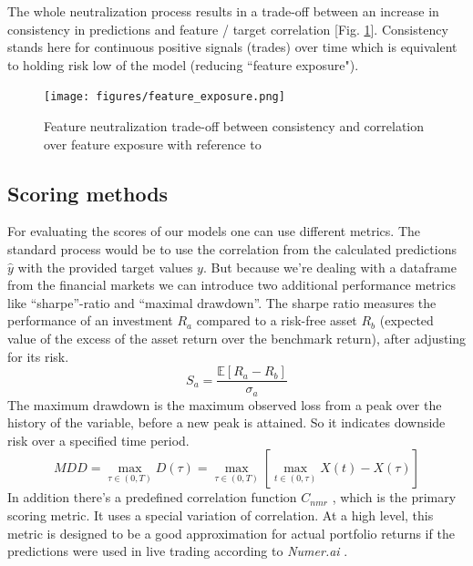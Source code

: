 \documentclass[12pt, a4paper]{article}
\begin{document}
The whole neutralization process results in a trade-off between an increase in consistency in predictions and feature / target correlation [Fig. \ref{fig: feature_neutral}]. Consistency stands here for continuous positive signals (trades) over time which is equivalent to holding risk low of the model (reducing ``feature exposure").
\begin{figure}[!htpb]
    \centering
    \texttt{[image: figures/feature\_exposure.png]}
    \caption[Feature neutralization trade-off]{Feature neutralization trade-off between consistency and correlation over feature exposure with reference to \cite{Bobyfish2022}}
    \label{fig: feature_neutral}
\end{figure}
\subsection{Scoring methods}
For evaluating the scores of our models one can use different metrics. The standard process would be to use the correlation from the calculated predictions $\hat{y}$ with the provided target values $y$. But because we're dealing with a dataframe from the financial markets we can introduce two additional performance metrics like ``sharpe''-ratio and ``maximal drawdown''. The sharpe ratio measures the performance of an investment $R_a$ compared to a risk-free asset $R_b$ (expected value of the excess of the asset return over the benchmark return), after adjusting for its risk.
\begin{equation}
    \label{eq: sharpe_ratio}
    S_a = \frac{\mathbb{E}[R_a - R_b]}{\sigma_a}
\end{equation}
The maximum drawdown is the maximum observed loss from a peak over the history of the variable, before a new peak is attained. So it indicates downside risk over a specified time period.
\begin{equation}
\label{eq: mdd}
    MDD = \underset{\tau \in (0,T)}{\max} D(\tau) =  \underset{\tau \in (0,T)}{\max} [ \underset{t \in (0,\tau)}{\max} X(t) - X(\tau)]
\end{equation}
In addition there's a predefined correlation function $C_{nmr}$ \cite{Numeraicorr}, which is the primary scoring metric. It uses a special variation of correlation. At a high level, this metric is designed to be a good approximation for actual portfolio returns if the predictions were used in live trading according to \textit{Numer.ai} \cite{Numerai}. \\
\newpage
\end{document}
